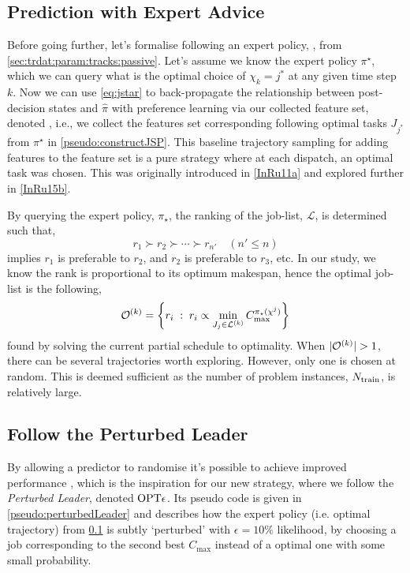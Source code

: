 \subsection{Prediction with Expert Advice}\label{sec:expertPolicy}
Before going further, let's formalise following an expert policy, 
\PhiSet{\OPT}, from \cref{sec:trdat:param:tracks:passive}.
Let's assume we know the expert policy $\pi^\star$, which we can query what 
is the optimal choice of $\chi_k={j^*}$ at any given time step $k$. 
Now we can use \cref{eq:jstar} to back-propagate the relationship between 
post-decision states and $\hat{\pi}$ with preference learning via our collected 
feature set, denoted \PhiSet{\OPT}, i.e., we collect the features set 
corresponding following optimal tasks $J_{j^*}$ from $\pi^\star$ in 
\cref{pseudo:constructJSP}.
This baseline trajectory sampling for adding features to the feature set 
is a pure strategy where at each dispatch, an optimal task was chosen.
This was originally introduced in \cref{InRu11a} and explored further in \cref{InRu15b}. 

By querying the expert policy, $\pi_\star$, the ranking of the job-list, 
$\mathcal{L}$, is determined such that,
\begin{equation}
r_1 \succ r_2 \succ \cdots \succ r_{n'} \quad (n' \leq n)
\end{equation}
implies $r_1$  is preferable to $r_2$, and $r_2$ is preferable to $r_3$, etc. 
In  our study, we know the rank is proportional to its optimum makespan, hence 
the optimal job-list is the following, 
\begin{equation}
\mathcal{O}^{(k)}=\left\{r_i\;:\;r_i \propto \min_{J_j \in \mathcal{L}^{(k)}}
    C_{\max}^{\pi_\star({\mathbf{\chi}}^j)}\right\}
\end{equation}
found by solving the current partial schedule to optimality.
When $\lvert\mathcal{O}^{(k)}\rvert>1$, there can be several trajectories worth 
exploring. However, only one is chosen at random. This is deemed sufficient as 
the number of problem instances, $N_{\text{train}}$, is relatively large.

\subsection{Follow the Perturbed Leader}\label{sec:perturbedLeader}
By allowing a predictor to randomise it's possible to achieve improved 
performance \citep{CesaBianchi06,Hannan57}, which is the inspiration for our 
new strategy, where we follow the \emph{Perturbed Leader}, denoted 
$\text{OPT}\epsilon$. 
Its pseudo code is given in \cref{pseudo:perturbedLeader} and describes how the 
expert policy (i.e. optimal trajectory) from \cref{sec:expertPolicy} is subtly
`perturbed' with $\epsilon=10\%$ likelihood, by choosing a job corresponding 
to the second best $C_{\max}$ instead of a optimal one with some small 
probability. 


